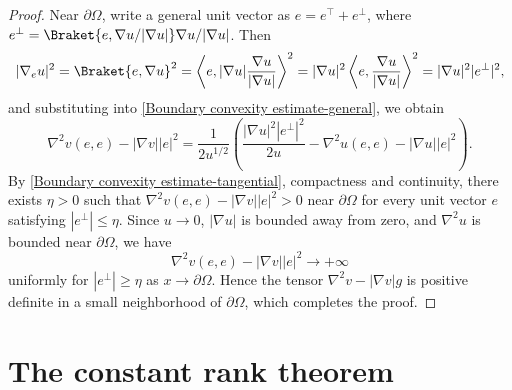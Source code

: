 \documentclass[11pt]{amsart}
\numberwithin{theorem}{section}
\numberwithin{equation}{section}
\begin{document}
\begin{proof}
Near $\partial\Omega$, write a general unit vector as $e=e^\top+e^\bot$, where $e^\bot=\Braket{e,\nabla u/|\nabla u|}\nabla u/|\nabla u|$. Then $$|\nabla_eu|^2=\Braket{e,\nabla u}^2=\left\langle e,|\nabla u|\frac{\nabla u}{|\nabla u|}\right\rangle^2=|\nabla u|^2\left\langle e,\frac{\nabla u}{|\nabla u|}\right\rangle^2=|\nabla u|^2|e^\bot|^2,$$ and substituting into \eqref{Boundary convexity estimate-general}, we obtain $$\nabla^2v(e,e)-|\nabla v||e|^2
=\frac{1}{2u^{1/2}}\left(\frac{|\nabla u|^2|e^\bot|^2}{2u}-\nabla^2u(e,e)-|\nabla u||e|^2\right).$$ By \eqref{Boundary convexity estimate-tangential}, compactness and continuity, there exists $\eta>0$ such that $\nabla^2v(e,e)-|\nabla v||e|^2>0$ near $\partial\Omega$ for every unit vector $e$ satisfying $|e^\bot|\leq\eta$. Since $u\rightarrow 0$, $|\nabla u|$ is bounded away from zero, and $\nabla^2u$ is bounded near $\partial\Omega$, we have $$\nabla^2v(e,e)-|\nabla v||e|^2\rightarrow+\infty$$ uniformly for $|e^\bot|\geq\eta$ as $x\rightarrow\partial\Omega$. Hence the tensor $\nabla^2v-|\nabla v|g$ is positive definite in a small neighborhood of $\partial\Omega$, which completes the proof.
\end{proof}

\section{The constant rank theorem}\label{Section 5}
\end{document}
